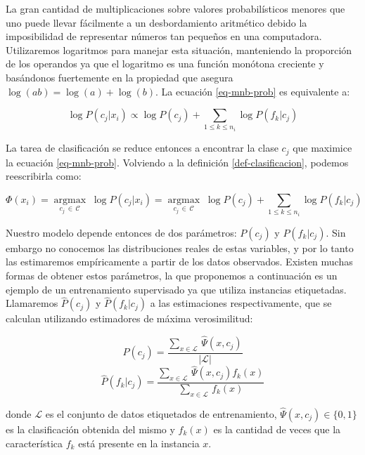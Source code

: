 La gran cantidad de multiplicaciones sobre valores probabilísticos menores que uno puede llevar fácilmente a un desbordamiento aritmético debido la imposibilidad de representar números tan pequeños en una computadora. Utilizaremos logaritmos para manejar esta situación, manteniendo la proporción de los operandos ya que el logaritmo es una función monótona creciente y basándonos fuertemente en la propiedad que asegura $\log(ab) = \log(a) + \log(b)$. La ecuación \ref{eq-mnb-prob} es equivalente a:

\begin{equation}
\log P(c_j|x_i) \propto \log P(c_j) + \sum_{1\leq k \leq n_i} \log P(f_k|c_j)
\end{equation}

La tarea de clasificación se reduce entonces a encontrar la clase $c_j$ que maximice la ecuación \ref{eq-mnb-prob}. Volviendo a la definición \ref{def-clasificacion}, podemos reescribirla como:

\begin{definition}
\begin{equation}
    \Phi(x_i) = \operatorname*{argmax}_{c_j \, \in \, \mathcal{C}} \; \log P(c_j|x_i) = \operatorname*{argmax}_{c_j \, \in \, \mathcal{C}} \; \log P(c_j) + \sum_{1\leq k \leq n_i} \log P(f_k|c_j)
\end{equation}
\end{definition}

Nuestro modelo depende entonces de dos parámetros: $P(c_j)$ y $P(f_k|c_j)$. Sin embargo no conocemos las distribuciones reales de estas variables, y por lo tanto las estimaremos empíricamente a partir de los datos observados. Existen muchas formas de obtener estos parámetros, la que proponemos a continuación es un ejemplo de un entrenamiento supervisado ya que utiliza instancias etiquetadas. Llamaremos $\hat{P}(c_j)$ y $\hat{P}(f_k|c_j)$ a las estimaciones respectivamente, que se calculan utilizando estimadores de máxima verosimilitud:

\begin{equation}
\hat{P}(c_j) = \frac{\sum_{x \in \mathcal{L}} \, \hat{\Psi}(x, c_j)}{|\mathcal{L}|}
\end{equation}
\begin{equation}\label{sin-smooth}
\hat{P}(f_k|c_j) = \frac{\sum_{x \in \mathcal{L}} \, \hat{\Psi}(x, c_j) f_k(x)}{\sum_{x \in \mathcal{L}} \, f_k(x)}
\end{equation}

donde $\mathcal{L}$ es el conjunto de datos etiquetados de entrenamiento, $\hat{\Psi}(x, c_j) \in \{0,1\}$ es la clasificación obtenida del mismo y $f_k(x)$ es la cantidad de veces que la característica $f_k$ está presente en la instancia $x$.

